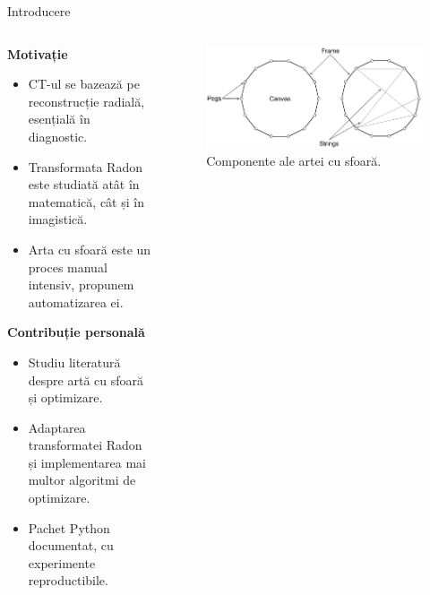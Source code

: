 \documentclass[aspectratio=169,xcolor=dvipsnames]{beamer}
\begin{document}
\begin{frame}{Introducere}
    \begin{columns}
        \begin{column}{0.6\textwidth}
            \textbf{Motivație}
            \begin{itemize}
                \item CT-ul se bazează pe reconstrucție radială, esențială în diagnostic.
                \item Transformata Radon este studiată atât în matematică, cât și în imagistică.
                \item Arta cu sfoară este un proces manual intensiv, propunem automatizarea ei.
            \end{itemize}

            \vspace{0.25cm}

            \textbf{Contribuție personală}
            \begin{itemize}
                \item Studiu literatură despre artă cu sfoară și optimizare.
                \item Adaptarea transformatei Radon și implementarea mai multor algoritmi de optimizare.
                \item Pachet Python documentat, cu experimente reproductibile.
            \end{itemize}
        \end{column}

        \begin{column}{0.4\textwidth}
            \begin{figure}
                \includegraphics[width=\linewidth]{images/stringart_components.pdf}
                \caption{Componente ale artei cu sfoară.}
            \end{figure}
        \end{column}
    \end{columns}
\end{frame}
\end{document}
